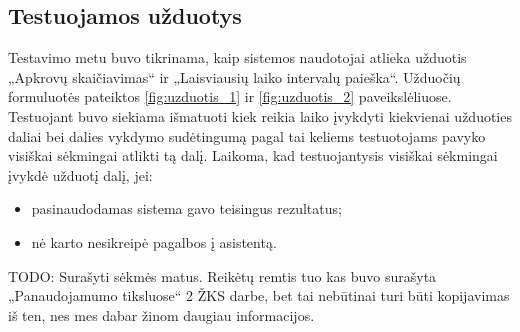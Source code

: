 


\subsection{Testuojamos užduotys}

Testavimo metu buvo tikrinama, kaip sistemos naudotojai atlieka
užduotis „Apkrovų skaičiavimas“ ir „Laisviausių laiko
intervalų paieška“. Užduočių formuluotės pateiktos
\ref{fig:uzduotis_1} ir \ref{fig:uzduotis_2} paveikslėliuose.
Testuojant buvo siekiama išmatuoti kiek reikia laiko įvykdyti
kiekvienai užduoties daliai bei dalies vykdymo sudėtingumą pagal tai
keliems testuotojams pavyko visiškai sėkmingai atlikti tą dalį.
Laikoma, kad testuojantysis visiškai sėkmingai įvykdė užduotį dalį,
jei:
\begin{itemize}
  \item pasinaudodamas sistema gavo teisingus rezultatus;
  \item nė karto nesikreipė pagalbos į asistentą.
\end{itemize}

TODO: Surašyti sėkmės matus. Reikėtų remtis tuo kas buvo surašyta
„Panaudojamumo tiksluose“ 2 ŽKS darbe, bet tai nebūtinai turi būti
kopijavimas iš ten, nes mes dabar žinom daugiau informacijos.

